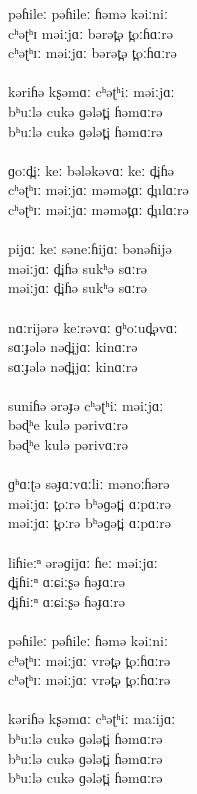 \documentclass[17pt]{extarticle}
\begin{document}
pəɦileː pəɦileː ɦəmə kəiːniː\\
cʰəʈʰɪ  məiːjɑː bərət̪ə t̪oːɦɑːrə\\
cʰəʈʰɪː məiːjɑː bərət̪ə t̪oːɦɑːrə\\\\
kəriɦə kʂəmɑː cʰəʈʰiː məiːjɑː\\
bʰuːlə cukə ɡələt̪i ɦəmɑːrə\\
bʰuːlə cukə ɡələt̪i ɦəmɑːrə\\\\
ɡoːd̪iː keː bələkəvɑː keː d̪iɦə\\
cʰəʈʰɪː məiːjɑː məmət̪ɑː d̪ulɑːrə\\
cʰəʈʰɪː məiːjɑː məmət̪ɑː d̪ulɑːrə\\\\
pijɑː keː səneːɦijɑː bənəɦijə\\
məiːjɑː d̪iɦə sukʰə sɑːrə\\
məiːjɑː d̪iɦə sukʰə sɑːrə\\\\
nɑːrijərə keːrəvɑː ɡʰoːud̪əvɑː\\
sɑːɟələ nəd̪ijɑː kinɑːrə\\
sɑːɟələ nəd̪ijɑː kinɑːrə\\\\
suniɦə ərəɟə cʰəʈʰiː məiːjɑː\\
bəɖʰe kulə pərivɑːrə\\
bəɖʰe kulə pərivɑːrə\\\\
ɡʰɑːʈə səɟɑːvɑːliː mənoːɦərə\\
məiːjɑː t̪oːrə bʰəɡət̪i ɑːpɑːrə\\
məiːjɑː t̪oːrə bʰəɡət̪i ɑːpɑːrə\\\\
liɦieːⁿ ərəɡijɑː ɦeː məiːjɑː\\
d̪iɦiːⁿ ɑːɕiːʂə ɦəɟɑːrə\\
d̪iɦiːⁿ ɑːɕiːʂə ɦəɟɑːrə\\\\
pəɦileː pəɦileː ɦəmə kəiːniː\\
cʰəʈʰɪː məiːjɑː vrət̪ə t̪oːɦɑːrə\\
cʰəʈʰɪː məiːjɑː vrət̪ə t̪oːɦɑːrə\\\\
kəriɦə kʂəmɑː cʰəʈʰiː maːijɑː\\
bʰuːlə cukə ɡələt̪i ɦəmɑːrə\\
bʰuːlə cukə ɡələt̪i ɦəmɑːrə\\
bʰuːlə cukə ɡələt̪i ɦəmɑːrə\\
\end{document}

